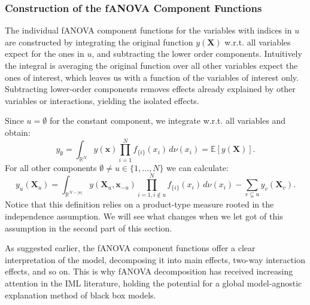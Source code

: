 \subsubsection{Construction of the fANOVA Component Functions}
The individual fANOVA component functions for the variables with indices in $u$ are constructed by integrating the original function $y(\boldsymbol{X})$ w.r.t. all variables expect for the ones in $u$, and subtracting the lower order components. Intuitively the integral is averaging the original function over all other variables expect the ones of interest, which leaves us with a function of the variables of interest only.
Subtracting lower-order components removes effects already explained by other variables or interactions, yielding the isolated effects.\par
Since $u = \emptyset$ for the constant component, we integrate w.r.t. all variables and obtain:
\begin{equation}
    y_{\emptyset} = \int_{\mathbb{R}^N} y(\boldsymbol{x}) \prod_{i=1}^{N} f_{\{i\}}(x_i) \, d\nu (x_i) = \mathbb{E}[y(\boldsymbol{X})].
    \label{eq:intercept_classical}
\end{equation}
For all other components $\emptyset \neq u \in \{1, \dots, N\}$ we can calculate:
\begin{equation}
    y_u(\boldsymbol{X}_u) = \int_{\mathbb{R}^{N- |u|}} y(\boldsymbol{X}_u, \boldsymbol{x}_{-u}) \prod_{i=1, i \notin u}^{N} f_{\{i\}}(x_i) \, d\nu (x_i)- \sum_{v \subsetneq u} y_v(\boldsymbol{X}_v).
    \label{eq:fanova_components_classical}
\end{equation}
Notice that this definition relies on a product-type measure rooted in the independence assumption. We will see what changes when we let got of this assumption in the second part of this section.\par
As suggested earlier, the fANOVA component functions offer a clear interpretation of the model, decomposing it into main effects, two-way interaction effects, and so on. This is why fANOVA decomposition has received increasing attention in the IML literature, holding the potential for a global model-agnostic explanation method of black box models.\par
